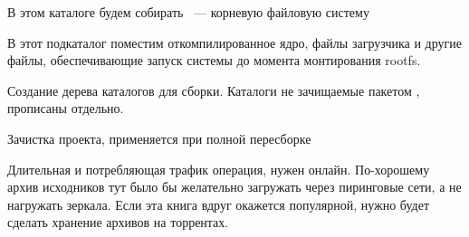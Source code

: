 
В этом каталоге будем собирать \ --- корневую файловую систему




В этот подкаталог поместим откомпилированное ядро, файлы загрузчика и другие
файлы, обеспечивающие запуск системы до момента монтирования rootfs.



\secup





Создание дерева каталогов для сборки.
Каталоги не зачищаемые пакетом , прописаны отдельно. 




Зачистка проекта, применяется при полной пересборке




Длительная и потребляющая трафик операция, нужен онлайн.
По-хорошему архив исходников тут было бы желательно загружать через пиринговые
сети, а не нагружать зеркала. Если эта книга вдруг окажется популярной, нужно
будет сделать хранение архивов на торрентах.





\secup